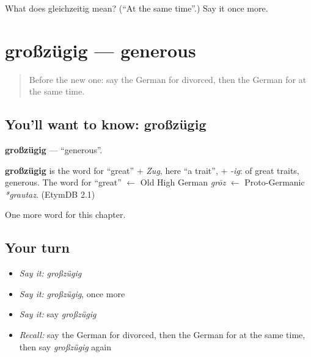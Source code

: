 \begin{tcolorbox}[breakable,colback=teal!4,colframe=teal!35!black,title={Before you move on}]
What does gleichzeitig mean? (\textquotedblleft{}At the same time\textquotedblright{}.) Say it once more.
\end{tcolorbox}
\section[großzügig]{großzügig — generous}

\label{lesson:GE-C215-grosszuegig}



\begin{quote}
Before the new one: say the German for divorced, then the German for at the same time.
\end{quote}

\subsection*{You'll want to know: großzügig}
\textbf{großzügig} — \textquotedblleft{}generous\textquotedblright{}.

\begin{cousinweb}
\textbf{großzügig} is the word for \textquotedblleft{}great\textquotedblright{} + \emph{Zug}, here \textquotedblleft{}a trait\textquotedblright{}, + \emph{-ig}: of great traits, generous. The word for \textquotedblleft{}great\textquotedblright{} $\leftarrow$ Old High German \emph{grōz} $\leftarrow$ Proto-Germanic \emph{*grautaz}. (EtymDB 2.1)
\end{cousinweb}

\begin{grammarlens}[title={What you've built}]
One more word for this chapter.
\end{grammarlens}

\subsection*{Your turn}
\begin{itemize}
\raggedright
  \item \emph{Say it:} \emph{großzügig}
  \item \emph{Say it:} \emph{großzügig}, once more
  \item \emph{Say it:} say \emph{großzügig}
  \item \emph{Recall:} say the German for divorced, then the German for at the same time, then say \emph{großzügig} again
\end{itemize}

